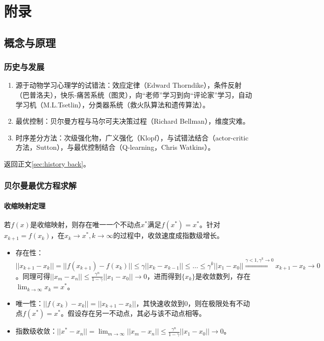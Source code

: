 \documentclass[
12pt, %
a4paper, 
oneside, %
]{scrartcl}
\begin{document}
\section{附录}
{\footnotesize
\subsection[概念与原理]{概念与原理}
\subsubsection[历史与发展]{历史与发展}\label{sec:history}
\begin{enumerate}
\item 源于动物学习心理学的试错法：效应定律（Edward Thorndike），条件反射（巴普洛夫），快乐-痛苦系统（图灵），向“老师”学习到向“评论家”学习，自动学习机（M.L.Tsetlin），分类器系统（救火队算法和遗传算法）。
\item 最优控制：贝尔曼方程与马尔可夫决策过程（Richard Bellman），维度灾难。
\item 时序差分方法：次级强化物，广义强化（Klopf），与试错法结合（actor-critic方法，Sutton），与最优控制结合（Q-learning，Chris Watkins）。
\end{enumerate}

返回正文\ref{sec:history back}。
\subsubsection[贝尔曼最优方程求解]{贝尔曼最优方程求解}\label{sec:Scalability Mapping}
\paragraph{收缩映射定理}
若$ f(x) $是收缩映射，则存在唯一一个不动点$ x^* $满足$ f(x^*) = x^* $。针对$ x_{k + 1} = f(x_k) $，在$ x_k \to x^*, k \to \infty $的过程中，收敛速度成指数级增长。
\begin{itemize}
\item 存在性：$ ||x_{k + 1} - x_k|| = ||f(x_{k + 1}) - f(x_k)|| \leq \gamma||x_k - x_{k - 1}|| \leq \dots \leq \gamma^k||x_1 - x_0|| \overset{\gamma < 1, \gamma^k \to 0}{\Longrightarrow} x_{k + 1} - x_k \to 0 $。同理可得$ ||x_m - x_n|| \leq \frac{\gamma^n}{1 - \gamma}||x_1 - x_0|| \to 0 $，进而得到$ \{x_k\} $是收敛数列，存在$ \lim_{k \to \infty} x_k = x^* $。
\item 唯一性：$ ||f(x_k) - x_k|| = ||x_{k + 1} - x_k|| $，其快速收敛到$ 0 $，则在极限处有不动点$ f(x^*) = x^* $。假设存在另一不动点，其必与该不动点相等。
\item 指数级收敛：$ ||x^* - x_n|| = \lim_{m \to \infty}||x_m - x_n|| \leq \frac{\gamma^n}{1 - \gamma}||x_1 - x_0|| \to 0 $。
\end{itemize}
}
\end{document}
